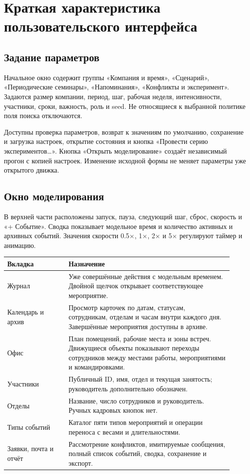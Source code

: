 \section{Краткая характеристика пользовательского интерфейса}
\subsection{Задание параметров}
Начальное окно содержит группы «Компания и время», «Сценарий», «Периодические семинары», «Напоминания», «Конфликты и эксперимент». Задаются размер компании, период, шаг, рабочая неделя, интенсивности, участники, сроки, важность, роль и seed. Не относящиеся к выбранной политике поля поиска отключаются.

Доступны проверка параметров, возврат к значениям по умолчанию, сохранение и загрузка настроек, открытие состояния и кнопка «Провести серию экспериментов…». Кнопка «Открыть моделирование» создаёт независимый прогон с копией настроек. Изменение исходной формы не меняет параметры уже открытого движка.

\subsection{Окно моделирования}
В верхней части расположены запуск, пауза, следующий шаг, сброс, скорость и «+ Событие». Сводка показывает модельное время и количество активных и архивных событий. Значения скорости 0.5$\times$, 1$\times$, 2$\times$ и 5$\times$ регулируют таймер и анимацию.

\begin{longtable}{L{0.25\linewidth}L{0.67\linewidth}}
\toprule Вкладка & Назначение \\\midrule\endhead
Журнал & Уже совершённые действия с модельным временем. Двойной щелчок открывает соответствующее мероприятие. \\
Календарь и архив & Просмотр карточек по датам, статусам, сотрудникам, отделам и часам внутри каждого дня. Завершённые мероприятия доступны в архиве. \\
Офис & План помещений, рабочие места и зоны встреч. Движущиеся объекты показывают переходы сотрудников между местами работы, мероприятиями и командировками. \\
Участники & Публичный ID, имя, отдел и текущая занятость; руководитель дополнительно обозначен. \\
Отделы & Название, число сотрудников и руководитель. Ручных кадровых кнопок нет. \\
Типы событий & Каталог пяти типов мероприятий и операции переноса с весами и длительностями. \\
Заявки, почта и отчёт & Рассмотрение конфликтов, имитируемые сообщения, полный список событий, сводка, сохранение и экспорт. \\
\bottomrule
\end{longtable}

